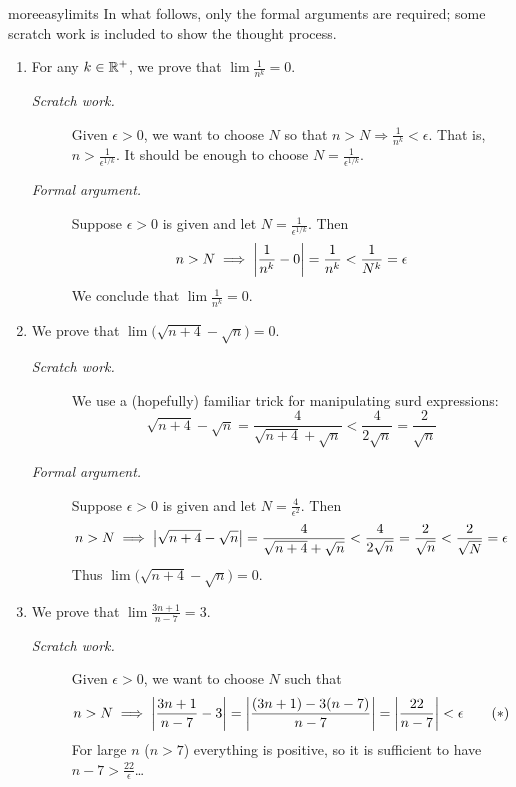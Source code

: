 \begin{examples}{}{moreeasylimits}
	In what follows, only the formal arguments are required; some scratch work is included to show the thought process.
	
	\begin{enumerate}
		\item\label{ex:stdzero} For any $k\in\mathbb{R}^+$, we prove that $\lim\frac 1{n^k}=0$.		
		\begin{description}
			\item[\normalfont\emph{Scratch work.}] Given $\epsilon>0$, we want to choose $N$ so that $n>N\Longrightarrow \frac 1{n^k}<\epsilon$.	That is, $n>\frac 1{\epsilon^{1/k}}$. It should be enough to choose $N=\frac 1{\epsilon^{1/k}}$.
			
			\item[\normalfont\emph{Formal argument.}] Suppose $\epsilon>0$ is given and let $N=\frac 1{\epsilon^{1/k}}$. Then
			\[
				n>N \implies \left| \frac 1{n^k}-0\right|=\frac 1{n^k}<\frac 1{N^k}=\epsilon
			\]
			We conclude that $\lim\frac 1{n^k}=0$.
		\end{description}
		
	
		
		\item We prove that $\lim \bigl(\sqrt{n+4}-\sqrt n\bigr) =0$.
		\begin{description}
			\item[\normalfont\emph{Scratch work.}] We use a (hopefully) familiar trick for manipulating surd expressions:
			\[
				\sqrt{n+4}-\sqrt n=\frac 4{\sqrt{n+4}+\sqrt n} 
				<\frac 4{2\sqrt n}=\frac 2{\sqrt n}
			\]
		
			\item[\normalfont\emph{Formal argument.}] Suppose $\epsilon>0$ is given and let $N=\frac 4{\epsilon^2}$. Then
			\[
				n>N\implies \left| \sqrt{n+4}-\sqrt n\right|=\frac 4{\sqrt{n+4}+\sqrt n} 
				<\frac 4{2\sqrt n}=\frac 2{\sqrt n}
				<\frac 2{\sqrt N}=\epsilon
			\]
			Thus $\lim\bigl(\sqrt{n+4}-\sqrt n\bigr) =0$.
		\end{description}
		
		
		\goodbreak
		

		\item\label{ex:ep2} We prove that $\lim\frac{3n+1}{n-7}=3$.
		\begin{description}
			\item[\normalfont\emph{Scratch work.}] Given $\epsilon>0$, we want to choose $N$ such that
			\[
				n>N\implies \left| \frac{3n+1}{n-7}-3\right|
				=\left| \frac{(3n+1)-3(n-7)}{n-7}\right|
				=\left| \frac{22}{n-7}\right|<\epsilon \tag{$\ast$}
			\]
			For large $n$ ($n>7$) everything is positive, so it is sufficient to have $n-7>\frac{22}\epsilon$\ldots
			

\end{description}
\end{enumerate}
\end{examples}
